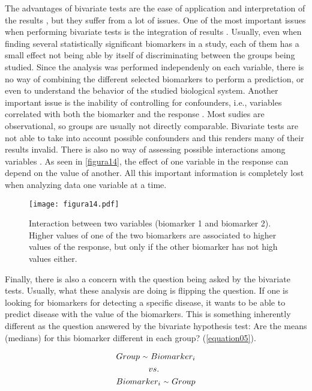 The advantages of bivariate tests are the ease of application and interpretation of the results \parencite{vetter2018unadjusted}, but they suffer from a lot of issues. One of the most important issues when performing bivariate tests is the integration of results \parencite{katz2011multivariable}. Usually, even when finding several statistically significant biomarkers in a study, each of them has a small effect not being able by itself of discriminating between the groups being studied. Since the analysis was performed independenly on each variable, there is no way of combining the different selected biomarkers to perform a prediction, or even to understand the behavior of the studied biological system. Another important issue is the inability of controlling for confounders, i.e., variables correlated with both the biomarker and the response \parencite{heinze2017five}. Most sudies are observational, so groups are usually not directly comparable. Bivariate tests are not able to take into account possible confounders and this renders many of their results invalid. There is also no way of assessing possible interactions among variables \parencite{hassall2018beyond}. As seen in \autoref{figura14}, the effect of one variable in the response can depend on the value of another. All this important information is completely lost when analyzing data one variable at a time.

\begin{figure}[hbtp]
	\centering
\texttt{[image: figura14.pdf]}
\caption[Interaction between two variables]{Interaction between two variables (biomarker 1 and biomarker 2). Higher values of one of the two biomarkers are associated to higher values of the response, but only if the other biomarker has not high values either.}
\label{figura14}
\end{figure}

Finally, there is also a concern with the question being asked by the bivariate tests. Usually, what these analysis are doing is flipping the question. If one is looking for biomarkers for detecting a specific disease, it wants to be able to predict disease with the value of the biomarkers. This is something inherently different as the question answered by the bivariate hypothesis test: Are the means (medians) for this biomarker different in each group? (\autoref{equation05}). 

\begin{equation}
\label{equation05}
\begin{split}
    Group\ {\raise.17ex\hbox{$\scriptstyle\sim$}}\ Biomarker_i \\
    vs. \phantom{MMMM}  \\
    Biomarker_i\ {\raise.17ex\hbox{$\scriptstyle\sim$}}\ Group
\end{split}
\end{equation}

